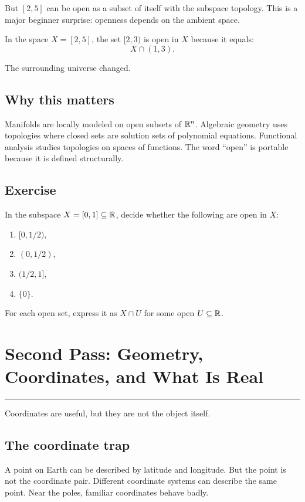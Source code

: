 \documentclass[12pt]{article}
\newcommand{\chapterline}{\vspace{0.4em}\hrule\vspace{0.8em}}
\begin{document}
But $[2,5]$ can be open as a subset of itself with the subspace topology. This is a major beginner surprise: openness depends on the ambient space.

In the space $X=[2,5]$, the set $[2,3)$ is open in $X$ because it equals:
\[
X\cap(1,3).
\]

The surrounding universe changed.

\subsection{Why this matters}

Manifolds are locally modeled on open subsets of $\mathbb{R}^n$. Algebraic geometry uses topologies where closed sets are solution sets of polynomial equations. Functional analysis studies topologies on spaces of functions. The word ``open'' is portable because it is defined structurally.

\subsection{Exercise}

In the subspace $X=[0,1]\subseteq\mathbb{R}$, decide whether the following are open in $X$:

\begin{enumerate}
\item $[0,1/2)$,
\item $(0,1/2)$,
\item $(1/2,1]$,
\item $\{0\}$.
\end{enumerate}

For each open set, express it as $X\cap U$ for some open $U\subseteq\mathbb{R}$.

\newpage
\section{Second Pass: Geometry, Coordinates, and What Is Real}
\chapterline

Coordinates are useful, but they are not the object itself.

\subsection{The coordinate trap}

A point on Earth can be described by latitude and longitude. But the point is not the coordinate pair. Different coordinate systems can describe the same point. Near the poles, familiar coordinates behave badly.
\end{document}
